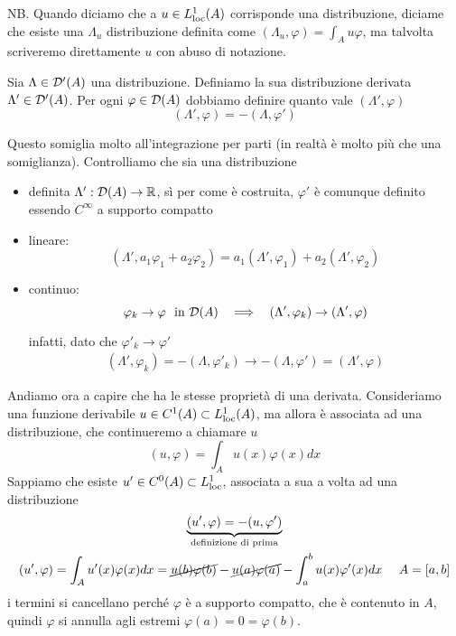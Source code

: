 NB. Quando diciamo che a $u\in L^{1}_{\operatorname{loc}}(A)$ corrisponde una distribuzione, diciame che esiste una $\Lambda_{u}$ distribuzione definita come $(\Lambda_{u}, \varphi) = \int_{A} u\varphi $, ma talvolta scriveremo direttamente $u$ con abuso di notazione.
\begin{defn}
Sia $\Lambda \in \mathcal{D}'(A)$ una distribuzione. Definiamo la sua distribuzione derivata $\Lambda'\in \mathcal{D}'(A)$. Per ogni $\varphi \in \mathcal{D}(A)$ dobbiamo definire quanto vale $(\Lambda', \varphi)$
\begin{equation*}
\boxed{(\Lambda', \varphi) = - (\Lambda, \varphi')}
\end{equation*}
\end{defn}
Questo somiglia molto all'integrazione per parti (in realtà è molto più che una somiglianza). Controlliamo che sia una distribuzione
\begin{itemize}
\item definita $\Lambda': \mathcal{D}(A)\rightarrow \mathbb{R}$, sì per come è costruita, $\varphi'$ è comunque definito essendo $C^{\infty}$ a supporto compatto
\item lineare:
\begin{equation*}
(\Lambda', a_{1} \varphi_{1} + a_{2} \varphi_{2}) = a_{1}(\Lambda', \varphi_{1}) + a_{2}(\Lambda', \varphi_{2})
\end{equation*}
\item continuo:
\begin{equation*}
\varphi_{k}\rightarrow \varphi \ \ \text{in} \ \mathcal{D}(A) \ \ \implies \ \ (\Lambda', \varphi_{k})\rightarrow (\Lambda', \varphi)
\end{equation*}

infatti, dato che $\varphi'_{k}\rightarrow \varphi'$
\begin{gather*}
(\Lambda', \varphi_{k}) = - (\Lambda, \varphi'_{k})\rightarrow - (\Lambda, \varphi') = (\Lambda', \varphi)
\end{gather*}
\end{itemize}

Andiamo ora a capire che ha le stesse proprietà di una derivata. Consideriamo una funzione derivabile $u\in C^{1}(A) \subset L^{1}_{\operatorname{loc}}(A)$, ma allora è associata ad una distribuzione, che continueremo a chiamare $u$
\begin{equation*}
(u, \varphi) = \int_{A} u(x) \varphi (x) dx
\end{equation*}
Sappiamo che esiste $u'\in C^{0}(A) \subset L^{1}_{\operatorname{loc}}$, associata a sua a volta ad una distribuzione
\begin{gather*}
\underbrace{(u', \varphi) = - (u, \varphi')}_{\text{definizione di prima}}\\
(u', \varphi) = \int_{A} u'(x) \varphi (x) dx = \cancel{u(b) \varphi (b)} - \cancel{u(a) \varphi (a)} - \int^{b}_{a} u(x) \varphi'(x) dx\ \ \ \ A = [a, b]
\end{gather*}
i termini si cancellano perché $\varphi $ è a supporto compatto, che è contenuto in $A$, quindi $\varphi $ si annulla agli estremi $\varphi (a) = 0 = \varphi (b)$.

